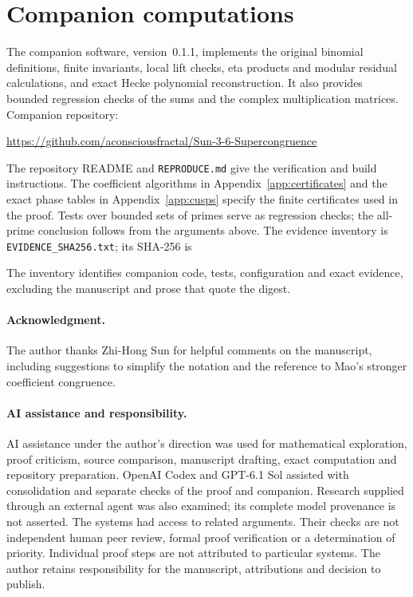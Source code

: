\documentclass[11pt,a4paper]{article}
\theoremstyle{remark}
\begin{document}
\section{Companion computations}\label{app:companion}
The companion software, version~0.1.1, implements the original
binomial definitions, finite invariants, local lift checks, eta
products and modular residual calculations, and exact Hecke
polynomial reconstruction. It also provides bounded regression
checks of the sums and the complex multiplication matrices.
Companion repository:
\begin{center}\small
\url{https://github.com/aconsciousfractal/Sun-3-6-Supercongruence}
\end{center}
The repository README and \texttt{REPRODUCE.md} give the verification
and build instructions. The coefficient algorithms in
Appendix~\ref{app:certificates} and the exact phase tables in
Appendix~\ref{app:cusps} specify the finite certificates used in
the proof. Tests over bounded sets of primes serve as regression
checks; the all-prime conclusion follows from the arguments above.
The evidence inventory is \texttt{EVIDENCE\_SHA256.txt}; its SHA-256 is
\begin{center}\footnotesize\ttfamily
{}
\end{center}
The inventory identifies companion code, tests, configuration and
exact evidence, excluding the manuscript and prose that quote the digest.

\paragraph{Acknowledgment.}
The author thanks Zhi-Hong Sun for helpful comments on the manuscript,
including suggestions to simplify the notation and the reference to Mao's
stronger coefficient congruence.

\paragraph{AI assistance and responsibility.}
AI assistance under the author's direction was used for mathematical
exploration, proof criticism, source comparison, manuscript drafting,
exact computation and repository preparation. OpenAI Codex and GPT-6.1 Sol
assisted with consolidation and separate checks of the proof and companion.
Research supplied through an external agent was also examined; its complete
model provenance is not asserted. The systems had access to related
arguments. Their checks are not independent human peer review, formal proof
verification or a determination of priority. Individual proof steps are not
attributed to particular systems. The author retains responsibility for
the manuscript, attributions and decision to publish.
\end{document}
